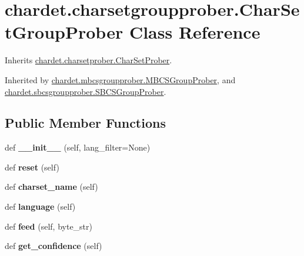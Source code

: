 \hypertarget{classchardet_1_1charsetgroupprober_1_1_char_set_group_prober}{}\section{chardet.\+charsetgroupprober.\+Char\+Set\+Group\+Prober Class Reference}
\label{classchardet_1_1charsetgroupprober_1_1_char_set_group_prober}


Inherits \hyperlink{classchardet_1_1charsetprober_1_1_char_set_prober}{chardet.\+charsetprober.\+Char\+Set\+Prober}.



Inherited by \hyperlink{classchardet_1_1mbcsgroupprober_1_1_m_b_c_s_group_prober}{chardet.\+mbcsgroupprober.\+M\+B\+C\+S\+Group\+Prober}, and \hyperlink{classchardet_1_1sbcsgroupprober_1_1_s_b_c_s_group_prober}{chardet.\+sbcsgroupprober.\+S\+B\+C\+S\+Group\+Prober}.

\subsection*{Public Member Functions}
\begin{DoxyCompactItemize}
\item 
\mbox{\label{classchardet_1_1charsetgroupprober_1_1_char_set_group_prober_a60edcb9386c3b22381aa0f9d79a37555}} 
def {\bfseries \+\_\+\+\_\+init\+\_\+\+\_\+} (self, lang\+\_\+filter=None)
\item 
\mbox{\label{classchardet_1_1charsetgroupprober_1_1_char_set_group_prober_a96d4eeb22f281f14898a3b66fe0edf02}} 
def {\bfseries reset} (self)
\item 
\mbox{\label{classchardet_1_1charsetgroupprober_1_1_char_set_group_prober_a918da8e734037cfcd60d8f165c9f1dcd}} 
def {\bfseries charset\+\_\+name} (self)
\item 
\mbox{\label{classchardet_1_1charsetgroupprober_1_1_char_set_group_prober_a9c9cb6d3e48151fe7764232835bcd3b0}} 
def {\bfseries language} (self)
\item 
\mbox{\label{classchardet_1_1charsetgroupprober_1_1_char_set_group_prober_af91401307c23295e28724b8bb49be351}} 
def {\bfseries feed} (self, byte\+\_\+str)
\item 
\mbox{\label{classchardet_1_1charsetgroupprober_1_1_char_set_group_prober_af6dc067ec6a8cbbbca6cf86e1e7c87b1}} 
def {\bfseries get\+\_\+confidence} (self)
\end{DoxyCompactItemize}
